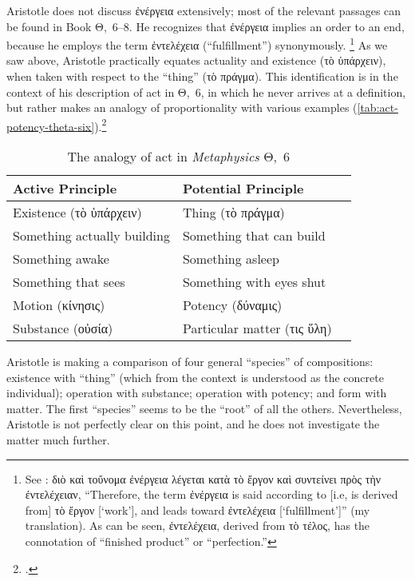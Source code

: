 Aristotle does not discuss ἐνέργεια extensively; most of the relevant passages can be found in Book Θ,~6–8. He recognizes that ἐνέργεια implies an order to an end, because he employs the term ἐντελέχεια (“fulfillment”) synonymously.%
%
\footnote{See \cite[Θ,~6, 1050a23]{aristotle:metaphysics}: διὸ καὶ τοὔνομα ἐνέργεια λέγεται κατὰ τὸ ἔργον καὶ συντείνει πρὸς τὴν ἐντελέχειαν, “Therefore, the term ἐνέργεια is said according to [i.e, is derived from] τὸ ἔργον [‘work’], and leads toward ἐντελέχεια [‘fulfillment’]” (my translation). As can be seen, ἐντελέχεια, derived from τὸ τέλος, has the connotation of “finished product” or “perfection.”} As we saw above, Aristotle practically equates actuality and existence (τὸ ὑπάρχειν), when taken with respect to the “thing” (τὸ πράγμα). This identification is in the context of his description of act in Θ,~6, in which he never arrives at a definition, but rather makes an analogy of proportionality with various examples (\autoref{tab:act-potency-theta-six}).\footcite[See][Θ,~6, 1048a25–1048b35]{aristotle:metaphysics}
%
\begin{table}
  \centering
  \begin{OnehalfSpacing}
    \begin{tabular}{llr}
      \toprule
        \textbf{Active Principle} & \textbf{Potential Principle}        \\
      \midrule
        Existence (τὸ ὑπάρχειν) & Thing (τὸ πράγμα)           \\
        Something actually building  & Something that can build         \\
        Something awake              & Something asleep                 \\
        Something that sees          & Something with eyes shut         \\
        Motion (κίνησις)        & Potency (δύναμις)           \\
        Substance (οὐσία)       & Particular matter (τις ὕλη) \\
      \bottomrule
    \end{tabular}
  \end{OnehalfSpacing}
  \caption{The analogy of act in \emph{Metaphysics} Θ,~6}
  \label{tab:act-potency-theta-six}
\end{table}
%
Aristotle is making a comparison of four general “species” of compositions: existence with “thing” (which from the context is understood as the concrete individual); operation with substance; operation with potency; and form with matter. The first “species” seems to be the “root” of all the others. Nevertheless, Aristotle is not perfectly clear on this point, and he does not investigate the matter much further.


